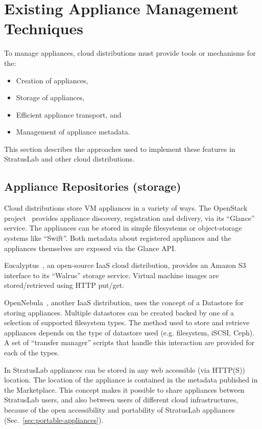 \section{Existing Appliance Management Techniques}
\label{sec:other-approaches}

To manage appliances, cloud distributions must provide tools or
mechanisms for the:
\begin{itemize}
\item Creation of appliances,
\item Storage of appliances,
\item Efficient appliance transport, and
\item Management of appliance metadata.
\end{itemize}
This section describes the approaches used to implement these features
in StratusLab and other cloud distributions.

\subsection{Appliance Repositories (storage)}

Cloud distributions store VM appliances in a variety of ways. 
The OpenStack project~\cite{openstack} provides appliance discovery, registration and delivery, 
via its ``Glance'' service. The appliances can be stored in simple filesystems or 
object-storage systems like ``Swift''\@. Both metadata about registered appliances 
and the appliances themselves are exposed via the Glance API\@.

Eucalyptus~\cite{eucalyptus}, an open-source IaaS cloud distribution, provides an Amazon S3 interface to its 
``Walrus'' storage service. Virtual machine images are stored/retrieved using HTTP put/get.

OpenNebula~\cite{opennebula}, another IaaS distribution, uses the concept of a Datastore for storing appliances. 
Multiple datastores can be created backed by one of a selection of supported filesystem types. 
The method used to store and retrieve appliances depends on the type of datastore used (e.g. filesystem, 
iSCSI, Ceph). A set of ``transfer manager'' scripts that handle this interaction are provided for 
each of the types.

In StratusLab appliances can be stored in any web accessible (via HTTP(S)) location. The location of the appliance 
is contained in the metadata published in the Marketplace\@. This concept makes it possible 
to share appliances between StratusLab users, and also between users of different cloud 
infrastructures, because of the open accessibility and portability of StratusLab appliances (Sec.~\ref{sec:portable-appliances}). 

